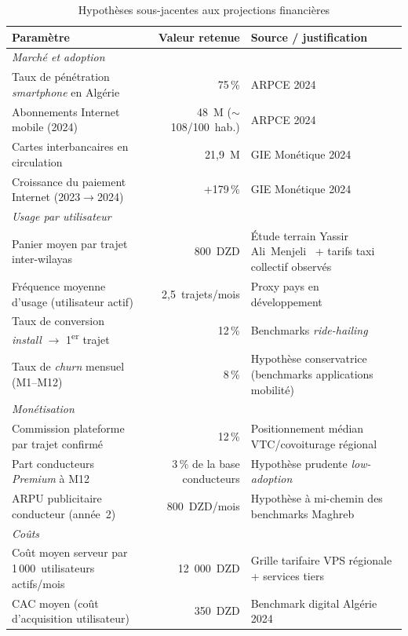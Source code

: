 \begin{table}[H]
\centering
\footnotesize
\begin{tabularx}{\textwidth}{|l|r|X|}
\hline
\rowcolor{rohlight}
\textbf{Paramètre} & \textbf{Valeur retenue} & \textbf{Source / justification} \\
\hline
\multicolumn{3}{|l|}{\cellcolor{rohlight!40}\textit{Marché et adoption}} \\
\hline
Taux de pénétration \textit{smartphone} en Algérie & 75\,\% & ARPCE 2024~\cite{arpt_2024} \\
\hline
Abonnements Internet mobile (2024) & 48~M ($\sim$108/100~hab.) & ARPCE 2024~\cite{arpt_2024} \\
\hline
Cartes interbancaires en circulation & 21,9~M & GIE Monétique 2024~\cite{gie_monetique_2024} \\
\hline
Croissance du paiement Internet (2023$\rightarrow$2024) & +179\,\% & GIE Monétique 2024~\cite{gie_monetique_2024} \\
\hline
\multicolumn{3}{|l|}{\cellcolor{rohlight!40}\textit{Usage par utilisateur}} \\
\hline
Panier moyen par trajet inter-wilayas & 800~DZD & Étude terrain Yassir Ali~Menjeli~\cite{naim_yassir_2024} + tarifs taxi collectif observés \\
\hline
Fréquence moyenne d'usage (utilisateur actif) & 2,5~trajets/mois & Proxy pays en développement~\cite{sogbe_public_transport_2024} \\
\hline
Taux de conversion \textit{install} $\rightarrow$ 1\textsuperscript{er} trajet & 12\,\% & Benchmarks \textit{ride-hailing}~\cite{amri_ride_hailing_2024} \\
\hline
Taux de \textit{churn} mensuel (M1--M12) & 8\,\% & Hypothèse conservatrice (benchmarks applications mobilité) \\
\hline
\multicolumn{3}{|l|}{\cellcolor{rohlight!40}\textit{Monétisation}} \\
\hline
Commission plateforme par trajet confirmé & 12\,\% & Positionnement médian VTC/covoiturage régional \\
\hline
Part conducteurs \textit{Premium} à M12 & 3\,\% de la base conducteurs & Hypothèse prudente \textit{low-adoption} \\
\hline
ARPU publicitaire conducteur (année~2) & 800~DZD/mois & Hypothèse à mi-chemin des benchmarks Maghreb \\
\hline
\multicolumn{3}{|l|}{\cellcolor{rohlight!40}\textit{Coûts}} \\
\hline
Coût moyen serveur par 1\,000~utilisateurs actifs/mois & 12~000~DZD & Grille tarifaire VPS régionale + services tiers \\
\hline
CAC moyen (coût d'acquisition utilisateur) & 350~DZD & Benchmark digital Algérie 2024 \\
\hline
\end{tabularx}
  \caption{Hypothèses sous-jacentes aux projections financières}
  \label{tab:hypotheses}
\end{table}

